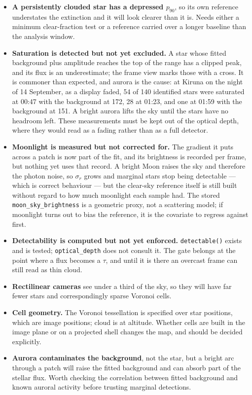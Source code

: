 \documentclass[11pt,a4paper]{article}
\begin{document}
\begin{itemize}
  \item \textbf{A persistently clouded star has a depressed $p_{90}$}, so its
    own reference understates the extinction and it will look clearer than it
    is. Needs either a minimum clear-fraction test or a reference carried over
    a longer baseline than the analysis window.
  \item \textbf{Saturation is detected but not yet excluded.} A star whose
    fitted background plus amplitude reaches the top of the range has a clipped
    peak, and its flux is an underestimate; the frame view marks those with a
    cross. It is commoner than expected, and aurora is the cause: at Kiruna on
    the night of 14 September, as a display faded, 54 of 140 identified stars
    were saturated at 00:47 with the background at 172, 28 at 01:23, and one at
    01:59 with the background at 151. A bright aurora lifts the sky until the
    stars have no headroom left. These measurements must be kept out of the
    optical depth, where they would read as a fading rather than as a full
    detector.
  \item \textbf{Moonlight is measured but not corrected for.} The gradient it
    puts across a patch is now part of the fit, and its brightness is recorded
    per frame, but nothing yet uses that record. A bright Moon raises the sky
    and therefore the photon noise, so $\sigma_r$ grows and marginal stars stop
    being detectable --- which is correct behaviour --- but the clear-sky
    reference itself is still built without regard to how much moonlight each
    sample had. The stored \texttt{moon\_sky\_brightness} is a geometric proxy,
    not a scattering model; if moonlight turns out to bias the reference, it is
    the covariate to regress against first.
  \item \textbf{Detectability is computed but not yet enforced.}
    \texttt{detectable()} exists and is tested; \texttt{optical\_depth} does not
    consult it. The gate belongs at the point where a flux becomes a $\tau$, and
    until it is there an overcast frame can still read as thin cloud.
  \item \textbf{Rectilinear cameras} see under a third of the sky, so they will
    have far fewer stars and correspondingly sparse Voronoi cells.
  \item \textbf{Cell geometry.} The Voronoi tessellation is specified over star
    positions, which are image positions; cloud is at altitude. Whether cells are
    built in the image plane or on a projected shell changes the map, and should
    be decided explicitly.
  \item \textbf{Aurora contaminates the background}, not the star, but a bright
    arc through a patch will raise the fitted background and can absorb part of
    the stellar flux. Worth checking the correlation between fitted background
    and known auroral activity before trusting marginal detections.
\end{itemize}
\end{document}
